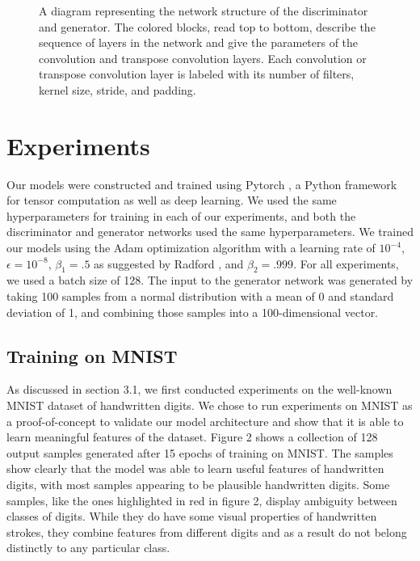 \documentclass[10pt,twocolumn,letterpaper]{article}
\begin{document}
\begin{figure}[t]
\begin{center}
	\end{center}
	\caption{A diagram representing the network structure of the discriminator and generator. The colored blocks, read top to bottom, describe the sequence of layers in the network and give the parameters of the convolution and transpose convolution layers. Each convolution or transpose convolution layer is labeled with its number of filters, kernel size, stride, and padding.}
	\label{fig:long}
	\label{fig:onecol}
\end{figure}

\section{Experiments}
Our models were constructed and trained using Pytorch \cite{paszke2017automatic}, a Python framework for tensor computation as well as deep learning. We used the same hyperparameters for training in each of our experiments, and both the discriminator and generator networks used the same hyperparameters. We trained our models using the Adam optimization algorithm \cite{kingma2014adam} with a learning rate of $ 10^{-4} $,  $ \epsilon = 10^{-8} $, $ \beta_{1} = .5 $ as suggested by Radford \etal \cite{radford2015unsupervised}, and $ \beta_{2} = .999 $. For all experiments, we used a batch size of 128. The input to the generator network was generated by taking 100 samples from a normal distribution with a mean of 0 and standard deviation of 1, and combining those samples into a 100-dimensional vector.

\subsection{Training on MNIST}
As discussed in section 3.1, we first conducted experiments on the well-known MNIST dataset of handwritten digits. We chose to run experiments on MNIST as a proof-of-concept to validate our model architecture and show that it is able to learn meaningful features of the dataset. Figure 2 shows a collection of 128 output samples generated after 15 epochs of training on MNIST. The samples show clearly that the model was able to learn useful features of handwritten digits, with most samples appearing to be plausible handwritten digits. Some samples, like the ones highlighted in red in figure 2, display ambiguity between classes of digits. While they do have some visual properties of handwritten strokes, they combine features from different digits and as a result do not belong distinctly to any particular class.
\end{document}
